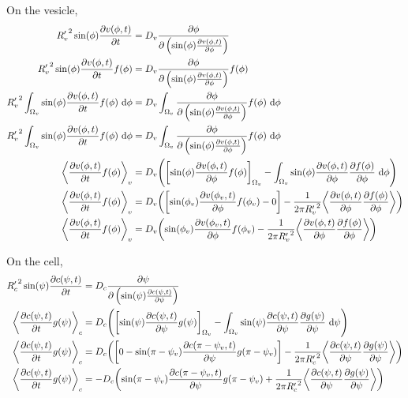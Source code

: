 \documentclass{report}
\newcommand\Par[1]{{ \left({#1}\right) }}
\newcommand\Brack[1]{{ \left[{#1}\right] }}
\newcommand\Angle[1]{{ \left\langle{#1}\right\rangle }}
\newcommand\Rc{{ R'_c }}
\newcommand\Rv{{ R'_v }}
\begin{document}
On the vesicle,
\begin{align*}
	\Rv^2 \sin(\phi) \pdv{v(\phi, t)}{t} &= D_v \pdv\phi \Par{\sin(\phi) \pdv{v(\phi, t)}{\phi}} \\
	\Rv^2 \sin(\phi) \pdv{v(\phi, t)}{t} f(\phi) &= D_v \pdv\phi \Par{\sin(\phi) \pdv{v(\phi, t)}{\phi}} f(\phi) \\
	\Rv^2 \int_{\Omega_v} \sin(\phi) \pdv{v(\phi, t)}{t} f(\phi)\ \dd\phi &= D_v \int_{\Omega_v} \pdv\phi \Par{\sin(\phi) \pdv{v(\phi, t)}{\phi}} f(\phi)\ \dd\phi \\
	\Rv^2 \int_{\Omega_v} \sin(\phi) \pdv{v(\phi, t)}{t} f(\phi)\ \dd\phi &= D_v \int_{\Omega_v} \pdv\phi \Par{\sin(\phi) \pdv{v(\phi, t)}{\phi}} f(\phi)\ \dd\phi \\
	\Angle{\pdv{v(\phi, t)}{t} f(\phi)}_v &= D_v \Par{\Brack{\sin(\phi) \pdv{v(\phi, t)}{\phi} f(\phi)}_{\Omega_v} - \int_{\Omega_v} \sin(\phi) \pdv{v(\phi, t)}{\phi} \pdv{f(\phi)}{\phi}\ \dd\phi} \\
	\Angle{\pdv{v(\phi, t)}{t} f(\phi)}_v &= D_v \Par{\Brack{\sin(\phi_v) \pdv{v(\phi_v, t)}{\phi} f(\phi_v) - 0} - \frac{1}{2\pi \Rv^2} \Angle{\pdv{v(\phi, t)}{\phi} \pdv{f(\phi)}{\phi}}} \\
	\Angle{\pdv{v(\phi, t)}{t} f(\phi)}_v &= D_v \Par{\sin(\phi_v) \pdv{v(\phi_v, t)}{\phi} f(\phi_v) - \frac{1}{2\pi \Rv^2} \Angle{\pdv{v(\phi, t)}{\phi} \pdv{f(\phi)}{\phi}}}
\end{align*}

On the cell,
\begin{align*}
	\Rc^2 \sin(\psi) \pdv{c(\psi, t)}{t} &= D_c \pdv\psi \Par{\sin(\psi) \pdv{c(\psi, t)}{\psi}} \\
	\Angle{\pdv{c(\psi, t)}{t} g(\psi)}_c &= D_c \Par{\Brack{\sin(\psi) \pdv{c(\psi, t)}{\psi} g(\psi)}_{\Omega_v} - \int_{\Omega_v} \sin(\psi) \pdv{c(\psi, t)}{\psi} \pdv{g(\psi)}{\psi}\ \dd\psi} \\
	\Angle{\pdv{c(\psi, t)}{t} g(\psi)}_c &= D_c \Par{\Brack{0 - \sin(\pi - \psi_v) \pdv{c(\pi - \psi_v, t)}{\psi} g(\pi - \psi_v)} - \frac{1}{2\pi \Rc^2} \Angle{\pdv{c(\psi, t)}{\psi} \pdv{g(\psi)}{\psi}}} \\
	\Angle{\pdv{c(\psi, t)}{t} g(\psi)}_c &= -D_c \Par{\sin(\pi - \psi_v) \pdv{c(\pi - \psi_v, t)}{\psi} g(\pi - \psi_v) + \frac{1}{2\pi \Rc^2} \Angle{\pdv{c(\psi, t)}{\psi} \pdv{g(\psi)}{\psi}}}
\end{align*}
\end{document}
